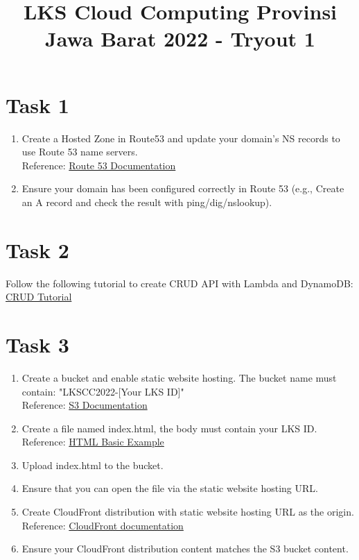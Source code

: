 \documentclass{article}
\title{LKS Cloud Computing Provinsi Jawa Barat 2022 - Tryout 1}
\author{}
\begin{document}
\maketitle

\section*{Task 1}
\begin{enumerate}
\item Create a Hosted Zone in Route53 and update your domain's NS records to use Route 53 name servers.\\
Reference: \href{https://docs.aws.amazon.com/Route53/latest/DeveloperGuide/Welcome.html}{Route 53 Documentation}
\item Ensure your domain has been configured correctly in Route 53 (e.g., Create an A record and check the result with ping/dig/nslookup).
\end{enumerate}

\section*{Task 2}
Follow the following tutorial to create CRUD API with Lambda and DynamoDB:
\href{https://docs.aws.amazon.com/apigateway/latest/developerguide/http-api-dynamo-db.html}{CRUD Tutorial}

\section*{Task 3}
\begin{enumerate}
\item Create a bucket and enable static website hosting. The bucket name must contain: "LKSCC2022-[Your LKS ID]"\\
Reference: \href{https://docs.aws.amazon.com/AmazonS3/latest/userguide/Welcome.html}{S3 Documentation}
\item Create a file named index.html, the body must contain your LKS ID.\\
Reference: \href{https://www.w3schools.com/html/html_basic.asp}{HTML Basic Example} 
\item Upload index.html to the bucket.
\item Ensure that you can open the file via the static website hosting URL.
\item Create CloudFront distribution with static website hosting URL as the origin.\\
Reference: \href{https://docs.aws.amazon.com/AmazonCloudFront/latest/DeveloperGuide/Introduction.html}{CloudFront documentation}
\item Ensure your CloudFront distribution content matches the S3 bucket content.
\end{enumerate}
\end{document}
